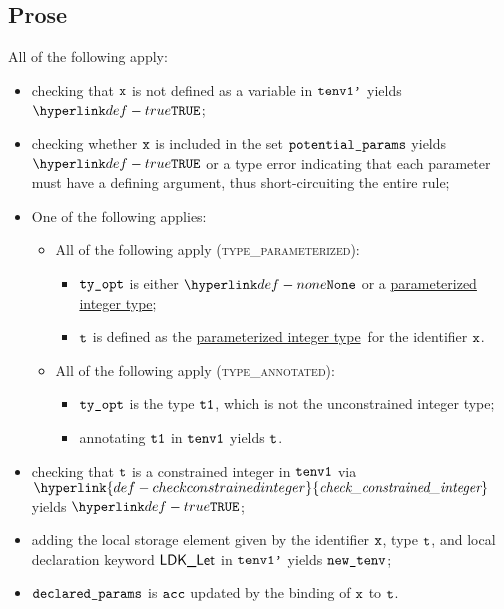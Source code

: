 \documentclass{book}
\newcommand\ProseOrTypeError[0]{\ProseTerminateAs{\TypeErrorConfig}}
\newcommand\checkconstrainedinteger[0]{\hyperlink{def-checkconstrainedinteger}{\textfunc{check\_constrained\_integer}}}
\newcommand\parameterizedintegertype[0]{\hyperlink{def-parameterizedintegertype}{parameterized integer type}}
\begin{document}
\subsection{Prose}
All of the following apply:
\begin{itemize}
  \item checking that $\texttt{x}$ is not defined as a variable in $\texttt{tenv1'}$ yields $\True$\ProseOrTypeError;
  \item checking whether $\texttt{x}$ is included in the set $\texttt{potential\_params}$ yields $\True$ or a type error
        indicating that each parameter must have a defining argument, thus short-circuiting the entire rule;
  \item One of the following applies:
  \begin{itemize}
    \item All of the following apply (\textsc{type\_parameterized}):
    \begin{itemize}
      \item $\texttt{ty\_opt}$ is either $\None$ or a \parameterizedintegertype;
      \item $\texttt{t}$ is defined as the \parameterizedintegertype\ for the identifier $\texttt{x}$.
    \end{itemize}

    \item All of the following apply (\textsc{type\_annotated}):
    \begin{itemize}
      \item $\texttt{ty\_opt}$ is the type $\texttt{t1}$, which is not the unconstrained integer type;
      \item annotating $\texttt{t1}$ in $\texttt{tenv1}$ yields $\texttt{t}$\ProseOrTypeError.
    \end{itemize}
  \end{itemize}
  \item checking that $\texttt{t}$ is a constrained integer in $\texttt{tenv1}$ via $\checkconstrainedinteger$
        yields $\True$\ProseOrTypeError;
  \item adding the local storage element given by the identifier $\texttt{x}$, type $\texttt{t}$, and local declaration keyword
        $\textsf{LDK\_Let}$ in $\texttt{tenv1'}$ yields $\texttt{new\_tenv}$;
  \item $\texttt{declared\_params}$ is $\texttt{acc}$ updated by the binding of $\texttt{x}$ to $\texttt{t}$.
\end{itemize}
\end{document}
